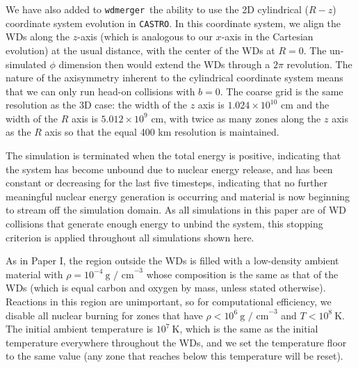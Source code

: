 \documentclass[twocolumn,numberedappendix]{../aastex6}
\newcommand{\castro}{\texttt{CASTRO}}
\newcommand{\wdmerger}{\texttt{wdmerger}}
\begin{document}
We have also added to \wdmerger\ the ability to use the 2D cylindrical ($R-z$)
coordinate system evolution in \castro. In this coordinate system, we align
the WDs along the $z$-axis (which is analogous to our $x$-axis in the Cartesian
evolution) at the usual distance, with the center of the WDs at $R = 0$. The
un-simulated $\phi$ dimension then would extend the WDs through a $2\pi$ revolution.
The nature of the axisymmetry inherent to the cylindrical coordinate system
means that we can only run head-on collisions with $b = 0$. The coarse grid
is the same resolution as the 3D case: the width of the $z$ axis is $1.024 \times 10^{10}$
cm and the width of the $R$ axis is $5.012 \times 10^{9}$ cm, with twice as
many zones along the $z$ axis as the $R$ axis so that the equal 400 km
resolution is maintained.

The simulation is terminated when the total energy is positive, indicating that
the system has become unbound due to nuclear energy release, and has been
constant or decreasing for the last five timesteps, indicating that no further
meaningful nuclear energy generation is occurring and material is now beginning
to stream off the simulation domain. As all simulations in this paper are of
WD collisions that generate enough energy to unbind the system, this stopping
criterion is applied throughout all simulations shown here.

As in Paper I, the region outside the WDs is filled with a low-density ambient
material with $\rho = 10^{-4}\ \text{g / cm}^{-3}$ whose composition is the
same as that of the WDs (which is equal carbon and oxygen by mass, unless
stated otherwise). Reactions in this region are unimportant, so for
computational efficiency, we disable all nuclear burning for zones that have
$\rho < 10^6\ \text{g / cm}^{-3}$ and $T < 10^8\ \text{K}$. The initial ambient
temperature is $10^7\ \text{K}$, which is the same as the initial temperature
everywhere throughout the WDs, and we set the temperature floor to the same
value (any zone that reaches below this temperature will be reset).
\end{document}

